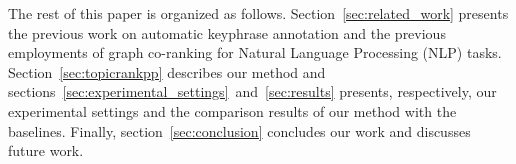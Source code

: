 
  The rest of this paper is organized as follows. Section~\ref{sec:related_work}
  presents the previous work on automatic keyphrase annotation and the previous
  employments of graph co-ranking for Natural Language Processing (NLP) tasks.
  Section~\ref{sec:topicrankpp} describes our method and
  sections~\ref{sec:experimental_settings}~and~\ref{sec:results} presents,
  respectively, our experimental settings and the comparison results of our
  method with the baselines. Finally, section~\ref{sec:conclusion} concludes our
  work and discusses future work.

